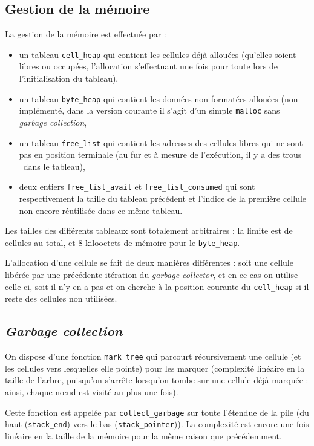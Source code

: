 \documentclass[a4paper, 10pt, french]{article}
\newcommand{\codeC}[1]{\texttt{#1}}
\newcommand{\foreign}[1]{\emph{#1}}
\begin{document}
\subsection{Gestion de la mémoire}

La gestion de la mémoire est effectuée par :
\begin{itemize}
  \item un tableau \codeC{cell_heap} qui contient les cellules déjà allouées (qu'elles soient libres ou occupées, l'allocation s'effectuant une fois pour toute lors de l'initialisation du tableau),
  \item un tableau \codeC{byte_heap} qui contient les données non formatées allouées (non implémenté, dans la version courante il s'agit d'un simple \codeC{malloc} sans \foreign{garbage collection},
  \item un tableau \codeC{free_list} qui contient les adresses des cellules libres qui ne sont pas en position terminale (au fur et à mesure de l'exécution, il y a des \og trous \fg\ dans le tableau),
  \item deux entiers \codeC{free_list_avail} et \codeC{free_list_consumed} qui sont respectivement la taille du tableau précédent et l'indice de la première cellule non encore réutilisée dans ce même tableau.
\end{itemize}

Les tailles des différents tableaux sont totalement arbitraires : la limite est de  cellules au total, et 8 kilooctets de mémoire pour le \codeC{byte_heap}.

L'allocation d'une cellule se fait de deux manières différentes : soit une cellule libérée par une précédente itération du \foreign{garbage collector}, et en ce cas on utilise celle-ci, soit il n'y en a pas et on cherche à la position courante du \codeC{cell_heap} si il reste des cellules non utilisées.


\subsection{\foreign{Garbage collection}}

On dispose d'une fonction \codeC{mark_tree} qui parcourt récursivement une cellule (et les cellules vers lesquelles elle pointe) pour les marquer (complexité linéaire en la taille de l'arbre, puisqu'on s'arrête lorsqu'on tombe sur une cellule déjà marquée : ainsi, chaque nœud est visité au plus une fois).

Cette fonction est appelée par \codeC{collect_garbage} sur toute l'étendue de la pile (du haut (\codeC{stack_end}) vers le bas (\codeC{stack_pointer})). La complexité est encore une fois linéaire en la taille de la mémoire pour la même raison que précédemment.
\end{document}
